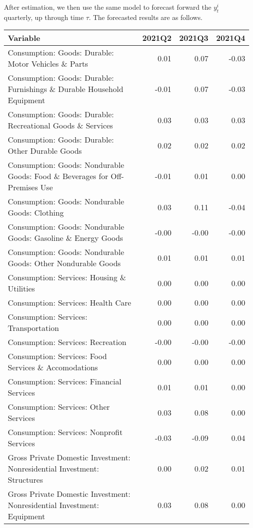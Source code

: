 \documentclass[11pt, letterpaper]{article}\usepackage[]{graphicx}\usepackage[]{color}
\begin{document}
After estimation, we then use the same model to forecast forward the $y^i_t$ quarterly, up through time $\tau$. 
The forecasted results are as follows.
\begin{table}[H]
\centering
\begingroup\scriptsize
\begin{tabular}{lrrr}
  \hline
Variable & 2021Q2 & 2021Q3 & 2021Q4 \\ 
  \hline
Consumption: Goods: Durable: Motor Vehicles \& Parts & 0.01 & 0.07 & -0.03 \\ 
  Consumption: Goods: Durable: Furnishings \& Durable Household Equipment & -0.01 & 0.07 & -0.03 \\ 
  Consumption: Goods: Durable: Recreational Goods \& Services & 0.03 & 0.03 & 0.03 \\ 
  Consumption: Goods: Durable: Other Durable Goods & 0.02 & 0.02 & 0.02 \\ 
  Consumption: Goods: Nondurable Goods: Food \& Beverages for Off-Premises Use & -0.01 & 0.01 & 0.00 \\ 
  Consumption: Goods: Nondurable Goods: Clothing & 0.03 & 0.11 & -0.04 \\ 
  Consumption: Goods: Nondurable Goods: Gasoline \& Energy Goods & -0.00 & -0.00 & -0.00 \\ 
  Consumption: Goods: Nondurable Goods: Other Nondurable Goods & 0.01 & 0.01 & 0.01 \\ 
  Consumption: Services: Housing \& Utilities & 0.00 & 0.00 & 0.00 \\ 
  Consumption: Services: Health Care & 0.00 & 0.00 & 0.00 \\ 
  Consumption: Services: Transportation & 0.00 & 0.00 & 0.00 \\ 
  Consumption: Services: Recreation & -0.00 & -0.00 & -0.00 \\ 
  Consumption: Services: Food Services \& Accomodations & 0.00 & 0.00 & 0.00 \\ 
  Consumption: Services: Financial Services & 0.01 & 0.01 & 0.00 \\ 
  Consumption: Services: Other Services & 0.03 & 0.08 & 0.00 \\ 
  Consumption: Services: Nonprofit Services & -0.03 & -0.09 & 0.04 \\ 
  Gross Private Domestic Investment: Nonresidential Investment: Structures & 0.00 & 0.02 & 0.01 \\ 
  Gross Private Domestic Investment: Nonresidential Investment: Equipment & 0.03 & 0.08 & 0.00 \\ 

\end{tabular}
\end{table}
\end{document}
